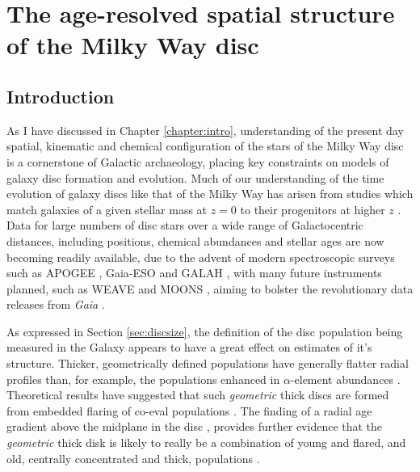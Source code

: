 \chapter{The age-resolved spatial structure of the Milky Way disc}
\label{chapter:apogeestruc}
\section{Introduction}

As I have discussed in Chapter \ref{chapter:intro}, understanding of the present day spatial, kinematic and chemical configuration of the stars of the Milky Way disc is a cornerstone of Galactic archaeology, placing key constraints on models of galaxy disc formation and evolution. Much of our understanding of the time evolution of galaxy discs like that of the Milky Way has arisen from studies which match galaxies of a given stellar mass at $z=0$ to their progenitors at higher $z$ \citep[and therefore, lookback time, e.g.][]{2013ApJ...771L..35V,2015ApJ...803...26P,2016MNRAS.462.4495H}. 
Data for large numbers of disc stars over a wide range of Galactocentric distances, including positions, chemical abundances and stellar ages are now becoming readily available, due to the advent of modern spectroscopic surveys such as APOGEE \citep{2015arXiv150905420M}, Gaia-ESO \citep{2012Msngr.147...25G} and GALAH \citep{2016arXiv160902822M}, with many future instruments planned, such as WEAVE \citep{2014SPIE.9147E..0LD} and MOONS \citep{2012SPIE.8446E..0SC}, aiming to bolster the revolutionary data releases from \emph{Gaia} \citep{2016A&A...595A...1G}.

As expressed in Section \ref{sec:discsize}, the definition of the disc population being measured in the Galaxy appears to have a great effect on estimates of it's structure. Thicker, geometrically defined populations have generally flatter radial profiles \citep[e.g.][]{2008ApJ...673..864J} than, for example, the populations enhanced in $\alpha$-element abundances \citep[e.g.][]{2012ApJ...752...51C,2012ApJ...753..148B,2016ApJ...823...30B}. Theoretical results have suggested that such \emph{geometric} thick discs are formed from embedded flaring of co-eval populations  \citep{2015ApJ...804L...9M}. The finding of a radial age gradient above the midplane in the disc \citep[e.g.][]{2016arXiv160901168M}, provides further evidence that the \emph{geometric} thick disk is likely to really be a combination of young and flared, and old, centrally concentrated and thick, populations \citep[as predicted by the models of][]{2015ApJ...804L...9M}.

